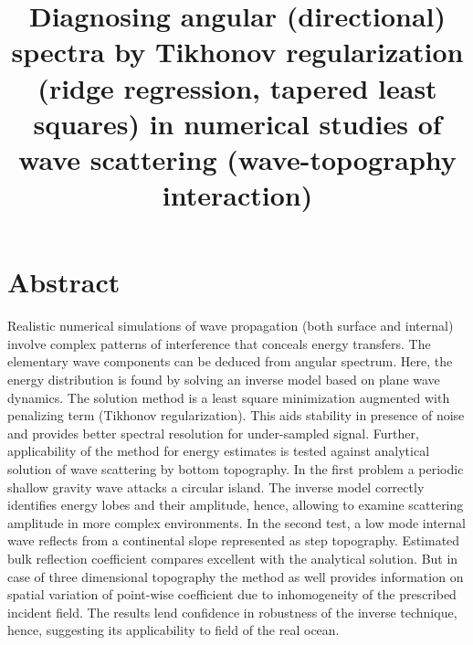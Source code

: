 



\title{Diagnosing angular (directional) spectra by Tikhonov regularization (ridge regression, tapered least squares) in numerical studies of wave scattering (wave-topography interaction)}
\maketitle

\section*{Abstract}
Realistic numerical simulations of wave propagation (both surface and internal) involve complex patterns of interference that conceals energy transfers. The elementary wave components can be deduced from angular spectrum. Here, the energy distribution is found by solving an inverse model based on plane wave dynamics. The solution method is a least square minimization augmented with penalizing term (Tikhonov regularization). This aids stability in presence of noise and provides better spectral resolution for under-sampled signal. Further, applicability of the method for energy estimates is tested against analytical solution of wave scattering by bottom topography. In the first problem a periodic shallow gravity wave attacks a circular island. The inverse model correctly identifies energy lobes and their amplitude, hence, allowing to examine scattering amplitude in more complex environments. In the second test, a low mode internal wave reflects from a continental slope represented as step topography. Estimated bulk reflection coefficient compares excellent with the analytical solution. But in case of three dimensional topography the method as well provides information on spatial variation of point-wise coefficient due to inhomogeneity of the prescribed incident field. The results lend confidence in robustness of the inverse technique, hence, suggesting its applicability to field of the real ocean.

